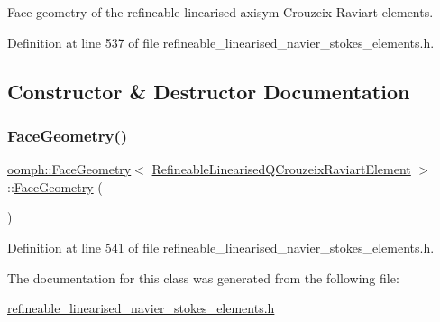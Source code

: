 Face geometry of the refineable linearised axisym Crouzeix-\/\+Raviart elements. 

Definition at line 537 of file refineable\+\_\+linearised\+\_\+navier\+\_\+stokes\+\_\+elements.\+h.



\subsection{Constructor \& Destructor Documentation}
\mbox{\label{classoomph_1_1FaceGeometry_3_01RefineableLinearisedQCrouzeixRaviartElement_01_4_a49c181d8fca317f614ee67c2e6ebe593}} 
\subsubsection{\texorpdfstring{Face\+Geometry()}{FaceGeometry()}}
{\footnotesize\ttfamily \hyperlink{classoomph_1_1FaceGeometry}{oomph\+::\+Face\+Geometry}$<$ \hyperlink{classoomph_1_1RefineableLinearisedQCrouzeixRaviartElement}{Refineable\+Linearised\+Q\+Crouzeix\+Raviart\+Element} $>$\+::\hyperlink{classoomph_1_1FaceGeometry}{Face\+Geometry} (\begin{DoxyParamCaption}{ }\end{DoxyParamCaption})\hspace{0.3cm}{\ttfamily [inline]}}



Definition at line 541 of file refineable\+\_\+linearised\+\_\+navier\+\_\+stokes\+\_\+elements.\+h.



The documentation for this class was generated from the following file\+:\begin{DoxyCompactItemize}
\item 
\hyperlink{refineable__linearised__navier__stokes__elements_8h}{refineable\+\_\+linearised\+\_\+navier\+\_\+stokes\+\_\+elements.\+h}\end{DoxyCompactItemize}
